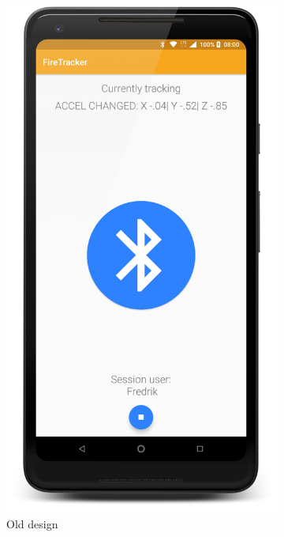 \documentclass[../Main/thesis.tex]{subfiles}
\begin{document}
\begin{figure}[h]
	\begin{subfigure}{0.2\textwidth}
		\includegraphics[width=\textwidth]{../fig/firetracker_app_old_3}
		\caption{Old design}
		\label{fig:app-old-design-tracking-iteration3}
	\end{subfigure}
	\begin{subfigure}{0.2\textwidth}

\end{subfigure}
\end{figure}
\end{document}
